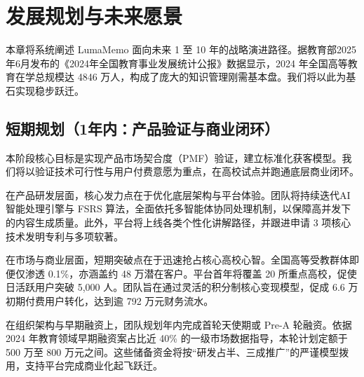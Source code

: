 
\chapter{发展规划与未来愿景}

本章将系统阐述 LumaMemo 面向未来 1 至 10 年的战略演进路径。据教育部2025年6月发布的《2024年全国教育事业发展统计公报》数据显示，2024 年全国高等教育在学总规模达 4846 万人，构成了庞大的知识管理刚需基本盘。我们将以此为基石实现稳步跃迁。

\section{短期规划（1年内：产品验证与商业闭环）}

本阶段核心目标是实现产品市场契合度（PMF）验证，建立标准化获客模型。我们将以验证技术可行性与用户付费意愿为重点，在高校试点并跑通底层商业闭环。

在产品研发层面，核心发力点在于优化底层架构与平台体验。团队将持续迭代AI智能处理引擎与 FSRS 算法，全面依托多智能体协同处理机制，以保障高并发下的内容生成质量。此外，平台将上线各类个性化讲解路径，并跟进申请 3 项核心技术发明专利与多项软著。

在市场与商业层面，短期突破点在于迅速抢占核心高校心智。全国高等受教群体即便仅渗透 0.1\%，亦涵盖约 48 万潜在客户。平台首年将覆盖 20 所重点高校，促使日活跃用户突破 5,000 人。团队旨在通过灵活的积分制核心变现模型，促成 6.6 万初期付费用户转化，达到逾 792 万元财务流水。

在组织架构与早期融资上，团队规划年内完成首轮天使期或 Pre-A 轮融资。依据 2024 年教育领域早期融资案占比近 40\% 的一级市场数据指导，本轮计划定额于 500 万至 800 万元之间。这些储备资金将按“研发占半、三成推广”的严谨模型拨用，支持平台完成商业化起飞跃迁。

